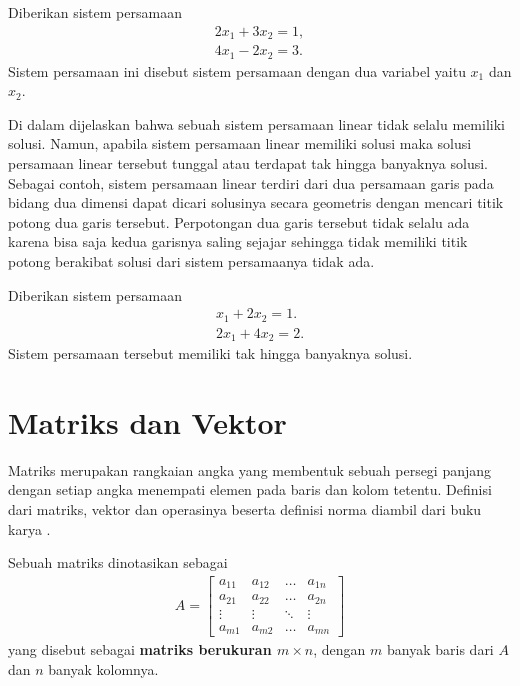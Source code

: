 \begin{contoh}
    Diberikan sistem persamaan
    \begin{align*}
        2x_1 + 3x_2 = 1,\\
        4x_1 - 2x_2 = 3.
    \end{align*}
    Sistem persamaan ini disebut sistem persamaan dengan dua variabel yaitu $x_1$ dan $x_2$.
\end{contoh}
Di dalam \citep{howard} dijelaskan bahwa sebuah sistem persamaan \mbox{linear} tidak selalu memiliki \mbox{solusi}. Namun, apabila sistem persamaan linear memiliki \mbox{solusi} maka solusi persamaan linear tersebut tunggal atau terdapat tak hingga banyaknya solusi. Sebagai contoh, sistem persamaan linear terdiri dari dua persamaan garis pada bidang dua dimensi dapat dicari solusinya secara geometris dengan mencari titik potong dua garis tersebut. Perpotongan dua garis tersebut tidak selalu ada karena bisa saja kedua garisnya saling sejajar sehingga tidak memiliki titik potong berakibat solusi dari sistem persamaanya tidak ada.

\begin{contoh}
    Diberikan sistem persamaan
    \begin{align*}
        x_1 + 2x_2 = 1. \\
        2x_1 + 4x_2 = 2.
    \end{align*}
    Sistem persamaan tersebut memiliki tak hingga banyaknya solusi.
\end{contoh}

\section{Matriks dan Vektor}
Matriks merupakan rangkaian angka yang membentuk sebuah persegi \mbox{panjang} dengan setiap angka menempati elemen pada baris dan kolom tetentu. Definisi \mbox{dari} matriks, vektor dan operasinya beserta definisi norma diambil dari buku karya \citep{howard}.

\begin{definisi}
Sebuah matriks dinotasikan sebagai
\begin{align*}    
A=
\begin{bmatrix}
a_{11} & a_{12} & \dots & a_{1n}\\
a_{21} & a_{22} & \dots & a_{2n}\\
\vdots & \vdots & \ddots & \vdots\\
a_{m1} & a_{m2} & \dots & a_{mn} 
\end{bmatrix}
\end{align*}
yang disebut sebagai \textbf{matriks berukuran $m \times n$}, dengan $m$ banyak baris dari $A$ dan $n$ banyak kolomnya. 
\end{definisi}

